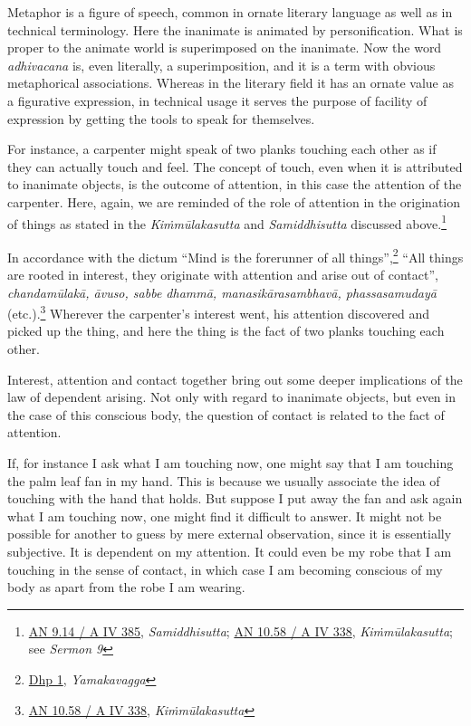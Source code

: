 Metaphor is a figure of speech, common in ornate literary language as well as in technical terminology. Here the inanimate is animated by personification. What is proper to the animate world is superimposed on the inanimate. Now the word \emph{adhivacana} is, even literally, a superimposition, and it is a term with obvious metaphorical associations. Whereas in the literary field it has an ornate value as a figurative expression, in technical usage it serves the purpose of facility of expression by getting the tools to speak for themselves.

For instance, a carpenter might speak of two planks touching each other as if they can actually touch and feel. The concept of touch, even when it is attributed to inanimate objects, is the outcome of attention, in this case the attention of the carpenter. Here, again, we are reminded of the role of attention in the origination of things as stated in the \emph{Kiṁmūlakasutta} and \emph{Samiddhisutta} discussed above.\footnote{\href{https://suttacentral.net/an9.14/pli/ms}{AN 9.14 / A IV 385}, \emph{Samiddhisutta}; \href{https://suttacentral.net/an10.58/pli/ms}{AN 10.58 / A IV 338}, \emph{Kiṁmūlakasutta}; see \emph{Sermon 9}}

In accordance with the dictum ``Mind is the forerunner of all things'',\footnote{\href{https://suttacentral.net/dhp1-20/pli/ms}{Dhp 1}, \emph{Yamakavagga}} ``All things are rooted in interest, they originate with attention and arise out of contact'', \emph{chandamūlakā, āvuso, sabbe dhammā, manasikārasambhavā, phassasamudayā} (etc.).\footnote{\href{https://suttacentral.net/an10.58/pli/ms}{AN 10.58 / A IV 338}, \emph{Kiṁmūlakasutta}} Wherever the carpenter's interest went, his attention discovered and picked up the thing, and here the thing is the fact of two planks touching each other.

Interest, attention and contact together bring out some deeper implications of the law of dependent arising. Not only with regard to inanimate objects, but even in the case of this conscious body, the question of contact is related to the fact of attention.

If, for instance I ask what I am touching now, one might say that I am touching the palm leaf fan in my hand. This is because we usually associate the idea of touching with the hand that holds. But suppose I put away the fan and ask again what I am touching now, one might find it difficult to answer. It might not be possible for another to guess by mere external observation, since it is essentially subjective. It is dependent on my attention. It could even be my robe that I am touching in the sense of contact, in which case I am becoming conscious of my body as apart from the robe I am wearing.

